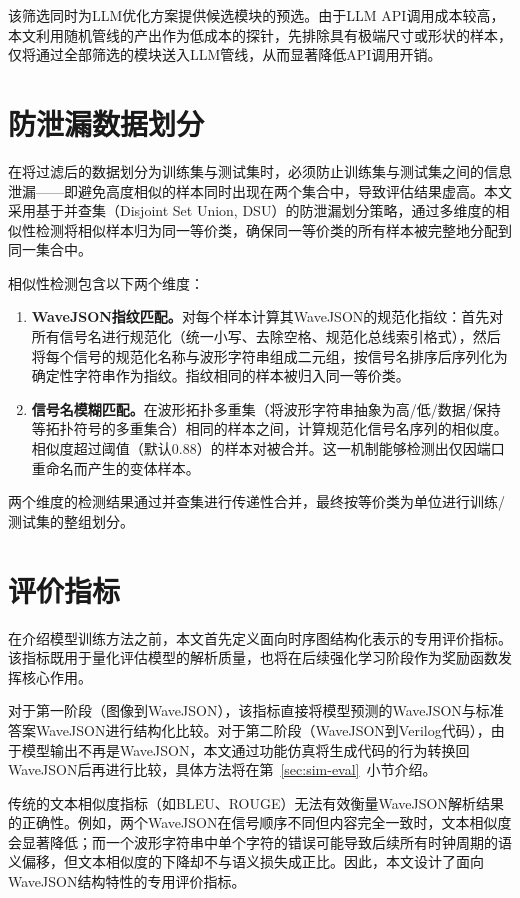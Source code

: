 该筛选同时为LLM优化方案提供候选模块的预选。由于LLM API调用成本较高，本文利用随机管线的产出作为低成本的探针，先排除具有极端尺寸或形状的样本，仅将通过全部筛选的模块送入LLM管线，从而显著降低API调用开销。


\section{防泄漏数据划分}

在将过滤后的数据划分为训练集与测试集时，必须防止训练集与测试集之间的信息泄漏——即避免高度相似的样本同时出现在两个集合中，导致评估结果虚高。本文采用基于并查集（Disjoint Set Union, DSU）的防泄漏划分策略，通过多维度的相似性检测将相似样本归为同一等价类，确保同一等价类的所有样本被完整地分配到同一集合中。

相似性检测包含以下两个维度：
\begin{enumerate}
  \item \textbf{WaveJSON指纹匹配。}对每个样本计算其WaveJSON的规范化指纹：首先对所有信号名进行规范化（统一小写、去除空格、规范化总线索引格式），然后将每个信号的规范化名称与波形字符串组成二元组，按信号名排序后序列化为确定性字符串作为指纹。指纹相同的样本被归入同一等价类。
  \item \textbf{信号名模糊匹配。}在波形拓扑多重集（将波形字符串抽象为高/低/数据/保持等拓扑符号的多重集合）相同的样本之间，计算规范化信号名序列的相似度。相似度超过阈值（默认0.88）的样本对被合并。这一机制能够检测出仅因端口重命名而产生的变体样本。
\end{enumerate}

两个维度的检测结果通过并查集进行传递性合并，最终按等价类为单位进行训练/测试集的整组划分。


\section{评价指标}\label{sec:metrics}

在介绍模型训练方法之前，本文首先定义面向时序图结构化表示的专用评价指标。该指标既用于量化评估模型的解析质量，也将在后续强化学习阶段作为奖励函数发挥核心作用。

对于第一阶段（图像到WaveJSON），该指标直接将模型预测的WaveJSON与标准答案WaveJSON进行结构化比较。对于第二阶段（WaveJSON到Verilog代码），由于模型输出不再是WaveJSON，本文通过功能仿真将生成代码的行为转换回WaveJSON后再进行比较，具体方法将在第~\ref{sec:sim-eval}~小节介绍。

传统的文本相似度指标（如BLEU、ROUGE）无法有效衡量WaveJSON解析结果的正确性。例如，两个WaveJSON在信号顺序不同但内容完全一致时，文本相似度会显著降低；而一个波形字符串中单个字符的错误可能导致后续所有时钟周期的语义偏移，但文本相似度的下降却不与语义损失成正比。因此，本文设计了面向WaveJSON结构特性的专用评价指标。

